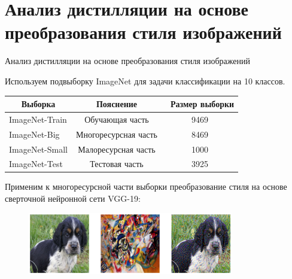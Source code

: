 \documentclass[10pt,pdf,hyperref={unicode}]{beamer}
\begin{document}
\section{Анализ дистилляции на основе преобразования стиля изображений}
\begin{frame}{Анализ дистилляции на основе преобразования стиля изображений}
\justifying

Используем подвыборку ImageNet для задачи классификации на 10 классов.

\begin{table}[h!t]
\begin{center}
\label{table_3}
\begin{tabular}{|c|c|c|}
\hline
	Выборка & Пояснение &\ Размер выборки\\
	\hline
	\multicolumn{1}{|l|}{ImageNet-Train}
	& Обучающая часть& 9469\\
	\hline
	\multicolumn{1}{|l|}{ImageNet-Big}
	& Многоресурсная часть& 8469\\
	\hline
	\multicolumn{1}{|l|}{ImageNet-Small}
	& Малоресурсная часть& 1000\\
	\hline
	\multicolumn{1}{|l|}{ImageNet-Test}
	& Тестовая часть& 3925\\
\hline
\end{tabular}
\end{center}
\end{table}

Применим к многоресурсной части выборки преобразование стиля на основе сверточной нейронной сети VGG-19:

\begin{figure}[h!]
\includegraphics[width=0.8\textwidth]{results/styletransfer.png}
\end{figure}

\end{frame}

\end{document}
